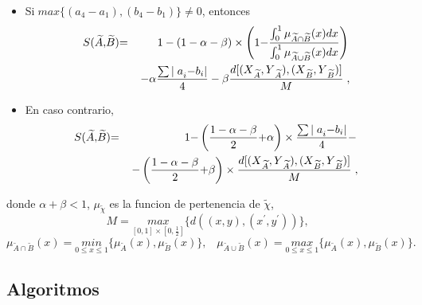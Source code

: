 {{\begin{itemize}
\item Si$\;{max} \{(a_{4}-a_{1}),(b_{4}-b_{1})\}\neq 0$, entonces
\begin{eqnarray*}
{\small S(}\widetilde{A}{\small ,}\widetilde{B}{\small )} &{\small =}&%
\left. {\small 1-(1-\alpha -\beta })\times \left ( {\small 1-}\frac{\int_{0}^{1}%
{\small \mu }_{\widetilde{A}\cap \widetilde{B}}{\small (x)dx}}{\int_{0}^{1}%
{\small \mu }_{\widetilde{A}\cup \widetilde{B}}{\small (x)dx}}\right)
\right.  \\
&&\left. -{\small \alpha } \frac{\sum {\small \mid a}_{i}{\small -b}_{i}%
{\small \mid }}{{\small 4}}-{\small \beta }\frac{{\small d[(X}_{\widetilde{A}%
}{\small ,Y}_{\widetilde{A}}{\small ),(X}_{\widetilde{B}}{\small ,Y}_{%
\widetilde{B}}{\small )]}}{{\small M}}\right.,
\end{eqnarray*}

\item En caso contrario,%
\begin{eqnarray*}
{\small S(}\widetilde{A}{\small ,}\widetilde{B}{\small )} &{\small =}&%
\left. {\small 1-}%
\left( \frac{{\small 1-\alpha -\beta }}{{\small 2}}{\small +\alpha } \right) \times
\frac{\sum {\small \mid a}_{i}{\small -b}_{i}{\small \mid }}{{\small 4}}%
{\small -}\right.  \\
&&\left. {\small -}\left( \frac{{\small 1-\alpha -\beta }}{{\small 2}}%
{\small +\beta }\right)\times \frac{{\small d[(X}_{\widetilde{A}}{\small ,Y}_{%
\widetilde{A}}{\small ),(X}_{\widetilde{B}}{\small ,Y}_{\widetilde{B}}%
{\small )]}}{{\small M}}\right.,
\end{eqnarray*}
\end{itemize}
donde $\alpha +\beta <1$, $\mu _{\widetilde{\chi }}$ es la funcion de pertenencia de $\widetilde{\chi}$,
\begin{equation}
M=\underset{[0,1]\times[0,\frac{1}{2}]}{max}\{d((x,y),(x^{\prime },y^{\prime }))\}\text{,}
\end{equation}%
\begin{equation*}
\mu _{\widetilde{A}\cap \widetilde{B}}(x)=\underset{0\leq x\leq 1}{min}%
\{\mu _{\widetilde{A}}(x),\mu _{\widetilde{B}}(x)\} ,
\;\;\; \mu _{\widetilde{A}\cup \widetilde{B}}(x)=\underset{0\leq x\leq 1}{max}%
\{\mu _{\widetilde{A}}(x),\mu _{\widetilde{B}}(x)\}.
\end{equation*}%

\subsection{Algoritmos}

}}
